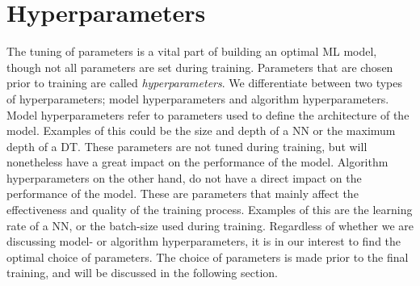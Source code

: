 \section{Hyperparameters}
The tuning of parameters is a vital part of building an optimal \ac{ML}
model, though not all parameters are set during training. Parameters 
that are chosen prior to training are called \emph{hyperparameters}. We differentiate
between two types of hyperparameters; model hyperparameters and algorithm 
hyperparameters. Model hyperparameters refer to parameters used to define the 
architecture of the model. Examples of this could be the size and depth of 
a \ac{NN} or the maximum depth of a \ac{DT}. These parameters are not tuned
during training, but will nonetheless have a great impact on the performance 
of the model. Algorithm hyperparameters on the other hand, do not have a direct impact 
on the performance of the model. These are parameters that mainly affect the 
effectiveness and quality of the training process. Examples of this are the 
learning rate of a \ac{NN}, or the batch-size used during training. Regardless 
of whether we are discussing model- or algorithm hyperparameters, it is in our interest
to find the optimal choice of parameters. The choice of parameters is made 
prior to the final training, and will be discussed in the following section.